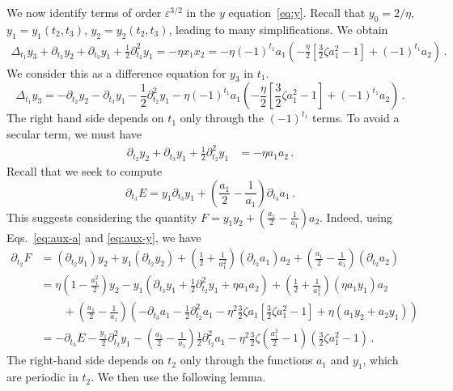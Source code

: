 \documentclass[11pt,english,reqno]{article}
\theoremstyle{plain}
\theoremstyle{definition}
\theoremstyle{remark}
\numberwithin{equation}{section}
\begin{document}
We now identify terms of order $\varepsilon^{3/2}$ in the $y$ equation~\eqref{eq:y}. Recall that $y_0 = 2/\eta$, $y_1 = y_1(t_2, t_3)$, $y_2 = y_2(t_2, t_3)$, leading to many simplifications. We obtain
\begin{align*}
    \Delta_{t_1} y_3 + \partial_{t_2} y_2 + \partial_{t_3} y_1 + \frac{1}{2} \partial_{t_2}^2 y_1 = - \eta x_1 x_2 = - \eta (-1)^{t_1} a_1 \left(-\frac{\eta}{2} \left[\frac{3}{2}\zeta a_1^2 - 1\right] + (-1)^{t_1}a_2\right) \, .
\end{align*}
We consider this as a difference equation for $y_3$ in $t_1$. \begin{equation*}
    \Delta_{t_1} y_3 = - \partial_{t_2} y_2 - \partial_{t_3} y_1 - \frac{1}{2} \partial_{t_2}^2 y_1 - \eta (-1)^{t_1} a_1 \left(-\frac{\eta}{2} \left[\frac{3}{2}\zeta a_1^2 - 1\right] + (-1)^{t_1}a_2\right) \, .
\end{equation*}
The right hand side depends on $t_1$ only through the $(-1)^{t_1}$ terms. To avoid a secular term, we must have 
\begin{align}
    \label{eq:aux-y}
    \partial_{t_2} y_2 + \partial_{t_3} y_1 + \frac{1}{2} \partial_{t_2}^2 y_1 &= - \eta a_1 a_2 \, .
\end{align}
Recall that we seek to compute 
\begin{equation*}
    \partial_{t_3} E = y_1 \partial_{t_3} y_1 + \left(\frac{a_1}{2}-\frac{1}{a_1}\right) \partial_{t_3} a_1 \, .
\end{equation*}
This suggests considering the quantity $F = y_1 y_2 + \left(\frac{a_1}{2}-\frac{1}{a_1}\right) a_2$. Indeed, using Eqs.~\eqref{eq:aux-a} and \eqref{eq:aux-y}, we have
\begin{align*}
    \partial_{t_2}F &= (\partial_{t_2} y_1) y_2 + y_1 (\partial_{t_2} y_2) + \left(\frac{1}{2} + \frac{1}{a_1^2}\right) (\partial_{t_2} a_1) a_2 + \left(\frac{a_1}{2}-\frac{1}{a_1}\right) (\partial_{t_2} a_2) \\
    &= \eta \left(1 - \frac{a_1^2}{2}\right) y_2 - y_1 \left(\partial_{t_3} y_1 + \frac{1}{2} \partial_{t_2}^2 y_1 + \eta a_1 a_2\right) + \left(\frac{1}{2} + \frac{1}{a_1^2}\right) (\eta a_1 y_1) a_2 \\
    &\qquad+ \left(\frac{a_1}{2}-\frac{1}{a_1}\right) \left(-\partial_{t_3} a_1 - \frac{1}{2} \partial_{t_2}^2 a_1 - \eta^2 \frac{3}{2} \zeta a_1 \left[\frac{3}{2}\zeta a_1^2 - 1\right] + \eta (a_1 y_2+ a_2 y_1)\right) \\
    &= -\partial_{t_3} E - \frac{y_1}{2} \partial_{t_2}^2 y_1 - \left(\frac{a_1}{2}-\frac{1}{a_1}\right) \frac{1}{2}\partial_{t_2}^2 a_1 - \eta^2 \frac{3}{2} \zeta \left(\frac{a_1^2}{2}-1\right)\left(\frac{3}{2}\zeta a_1^2 - 1\right) \, .
\end{align*}
The right-hand side depends on $t_2$ only through the functions $a_1$ and $y_1$, which are periodic in $t_2$. We then use the following lemma.
            
\end{document}
